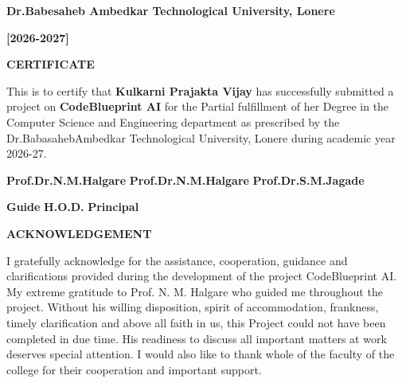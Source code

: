 \documentclass[0pt, a4 paper]{report}
\begin{document}
\begin{center}
{\begin{center}
\noindent \textbf{Dr.Babesaheb Ambedkar Technological University, Lonere}

\noindent \textbf{[2026-2027]} 


\end{center}

\thispagestyle{empty}



\newpage


\vspace{4 cm}

\begin{center}
\large \bfseries{CERTIFICATE}
\end{center}




\vspace{1 cm}   

\justify  \Large This is to certify that \textbf{Kulkarni Prajakta Vijay} has successfully submitted a project on \textbf{CodeBlueprint AI} for the Partial fulfillment of her Degree in the Computer Science and Engineering department as prescribed by the Dr.BabasahebAmbedkar Technological University, Lonere during academic year 2026-27.
 


\vspace{7 cm}
\Large \textbf{Prof.Dr.N.M.Halgare}  
\hspace{1.2 cm}
\textbf{Prof.Dr.N.M.Halgare}
\hspace{1.5 cm}
\textbf{Prof.Dr.S.M.Jagade} 


\noindent \hspace{1.8 cm} 
        \textbf{Guide}
        \hspace{4.5 cm}
        \textbf{H.O.D.}
        \hspace{3.7 cm}
        \textbf{Principal}

\thispagestyle{empty}
\newpage
\thispagestyle{empty}

\begin{center}
    \large
    \bfseries{\textbf{ACKNOWLEDGEMENT}}
\end{center}
    
\vspace{0.5 cm}
\begin{justify} 
I gratefully acknowledge for the assistance, cooperation, guidance and clarifications provided during the development of the project CodeBlueprint AI. My extreme gratitude to Prof. N. M. Halgare who guided me throughout the project. Without his willing disposition, spirit of accommodation, frankness, timely clarification and above all faith in us, this Project could not have been completed in due time. His readiness to discuss all important matters at work deserves special attention. I would also like to thank whole of the faculty of the college for their cooperation and important support.





\end{justify}}
\end{center}
\end{document}
